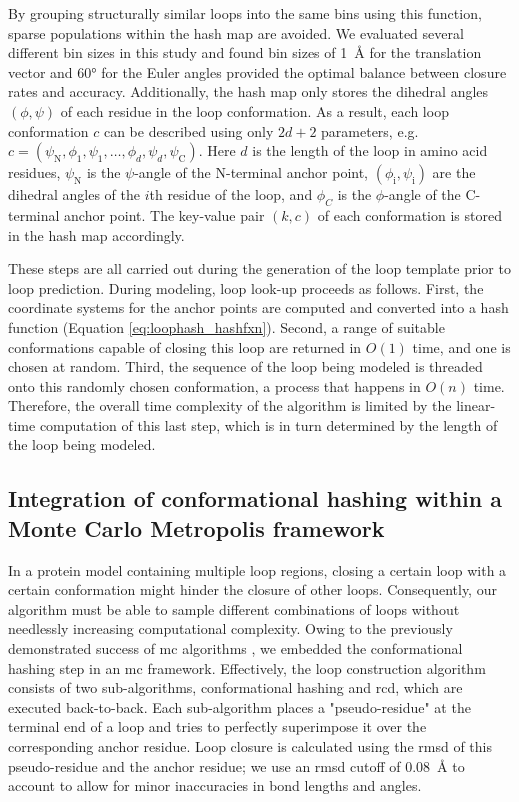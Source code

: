 By grouping structurally similar loops into the same bins using this function, sparse populations within the hash map are avoided. We evaluated several different bin sizes in this study and found bin sizes of \SI{1}{\angstrom} for the translation vector and 60° for the Euler angles provided the optimal balance between closure rates and accuracy. Additionally, the hash map only stores the dihedral angles $(\phi, \psi)$ of each residue in the loop conformation. As a result, each loop conformation $c$ can be described using only $2d+2$ parameters, e.g. $c=(\psi_{\mathup{N}},\phi_{1},\psi_1,…,\phi_d,\psi_d,\psi_{\mathup{C}})$. Here $d$ is the length of the loop in amino acid residues, $\psi_{\mathup{N}}$ is the $\psi$-angle of the N-terminal anchor point, $(\phi_{\mathup{i}},\psi_{\mathup{i}})$ are the dihedral angles of the $i$th residue of the loop, and $\phi_C$ is the $\phi$-angle of the C-terminal anchor point. The key-value pair $(k,c)$ of each conformation is stored in the hash map accordingly.

These steps are all carried out during the generation of the loop template prior to loop prediction. During modeling, loop look-up proceeds as follows. First, the coordinate systems for the anchor points are computed and converted into a hash function (Equation \ref{eq:loophash_hashfxn}). Second, a range of suitable conformations capable of closing this loop are returned in $O(1)$ time, and one is chosen at random. Third, the sequence of the loop being modeled is threaded onto this randomly chosen conformation, a process that happens in $O(n)$ time. Therefore, the overall time complexity of the algorithm is limited by the linear-time computation of this last step, which is in turn determined by the length of the loop being modeled.

\subsection{Integration of conformational hashing within a Monte Carlo Metropolis framework}

In a protein model containing multiple loop regions, closing a certain loop with a certain conformation might hinder the closure of other loops. Consequently, our algorithm must be able to sample different combinations of loops without needlessly increasing computational complexity. Owing to the previously demonstrated success of \gls{mc} algorithms \citep*{Leaver-fay2011, Leman2020, Karakas2012, Fischer2016a}, we embedded the conformational hashing step in an \gls{mc} framework. Effectively, the loop construction algorithm consists of two sub-algorithms, conformational hashing and \gls{rcd}, which are executed back-to-back. Each sub-algorithm places a "pseudo-residue" at the terminal end of a loop and tries to perfectly superimpose it over the corresponding anchor residue. Loop closure is calculated using the \gls{rmsd} of this pseudo-residue and the anchor residue; we use an \gls{rmsd} cutoff of \SI{0.08}{\angstrom} to account to allow for minor inaccuracies in bond lengths and angles.

